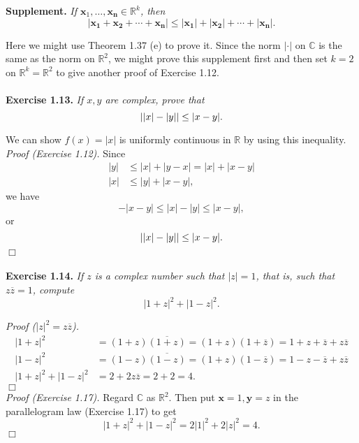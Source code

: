\documentclass{article}
\begin{document}
\textbf{Supplement.}
\emph{If $\mathbf{x}_1, \ldots, \mathbf{x_n} \in \mathbb{R}^k$, then
$$|\mathbf{x_1} + \mathbf{x_2} + \cdots + \mathbf{x_n}|
\leq |\mathbf{x_1}| + |\mathbf{x_2}| + \cdots + |\mathbf{x_n}|.$$}

Here we might use Theorem 1.37 (e) to prove it.
Since the norm $|\cdot|$ on $\mathbb{C}$ is the same as the norm on $\mathbb{R}^2$,
we might prove this supplement first
and then set $k = 2$ on $\mathbb{R}^k = \mathbb{R}^2$
to give another proof of Exercise 1.12. \\\\






\textbf{Exercise 1.13.}
\emph{If $x, y$ are complex, prove that
$$\abs{ \abs{x} - \abs{y} } \leq \abs{x-y}.$$}

We can show $f(x) = |x|$ is uniformly continuous in $\mathbb{R}$ by using this inequality. \\

\emph{Proof (Exercise 1.12).}
Since
\begin{align*}
|y| &\leq |x| + |y-x| = |x| + |x-y| \\
|x| &\leq |y| + |x-y|,
\end{align*}
we have
$$-|x-y| \leq |x| - |y| \leq |x-y|,$$
or
$$\abs{|x| - |y|} \leq |x-y|.$$
$\Box$ \\\\






\textbf{Exercise 1.14.}
\emph{If $z$ is a complex number such that $|z|=1$, that is, such that $z\overline{z}=1$,
compute
$$|1+z|^2+|1-z|^2.$$}

\emph{Proof ($|z|^2 = z\overline{z}$).}
\begin{align*}
|1+z|^2 &= (1+z)\overline{(1+z)} = (1+z)(1+\overline{z}) = 1+z+\overline{z}+z\overline{z} \\
|1-z|^2 &= (1-z)\overline{(1-z)} = (1+z)(1-\overline{z}) = 1-z-\overline{z}+z\overline{z} \\
|1+z|^2+|1-z|^2 &= 2+2z\overline{z} = 2+2 = 4.
\end{align*}
$\Box$ \\

\emph{Proof (Exercise 1.17).}
Regard $\mathbb{C}$ as $\mathbb{R}^2$.
Then put $\mathbf{x} = 1, \mathbf{y} = z$ in the parallelogram law (Exercise 1.17)
to get $$|1+z|^2+|1-z|^2 = 2|1|^2 + 2|z|^2 = 4.$$
$\Box$ \\\\
\end{document}
